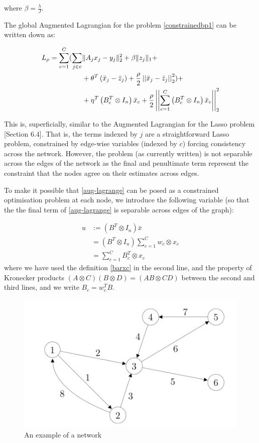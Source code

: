 \documentclass[conference]{IEEEtran}
\begin{document}
where \(\beta = \frac{\lambda}{J}\).

The global Augmented Lagrangian \cite{Boyd2010a}
 for the problem \eqref{constrainedbp1} can be written down as:

\begin{align}
L_\rho = \sum_{c=1}^C  ( \sum_{j \in c} & \|A_jx_j - y_j\|_2^2 + \beta\|z_j\|_1  + \nonumber \\ & + \theta^T\left(\bar{x}_j - \bar{z}_j\right)  +  \frac{\rho}{2}\vectornorm{\bar{x}_j-\bar{z}_j}_2^2 ) + \nonumber \\  & + \eta^T\left(B_c^T \otimes I_n\right)\bar{x}_c + \frac{\rho}{2}\vectornorm{\sum_{c=1}^C\left(B_c^T \otimes I_n\right)\bar{x}_c}_2^2
\label{aug-lagrange}
\end{align}

This is, superficially, similar to the Augmented Lagrangian for the Lasso problem \cite{Boyd2010a}[Section 6.4]. That is, the terms indexed by \(j\) are a straightforward Lasso problem, constrained by edge-wise variables (indexed by \(c\)) forcing consistency across the network. However, the problem (as currently written) is not separable across the edges of the network as the final and penultimate term represent the constraint that the nodes agree on their estimates across edges. 

To make it possible that \ref{aug-lagrange} can be posed  as a constrained optimisation problem at each node, we introduce the following variable (so that the the final term of \ref{aug-lagrange} is separable across edges of the graph):

\begin{defn}
\begin{align*}
u &:= \left(B^T \otimes I_n\right)\bar{x} \\
& = \left(B^T \otimes I_n\right)\sum_{c=1}^C w_c \otimes x_c \\
& = \sum	_{c=1}^C B_c^T\otimes x_c
\end{align*}
where we have used the definition \eqref{barxc} in the second line, and the property of Kronecker products \((A\otimes C)(B \otimes D) = (AB \otimes CD)\) between the second and third lines, and we write \(B_c = w_c^TB\).
\end{defn}

\begin{figure}[h]
\centering
\includegraphics[height = 5 cm]{network-ex-incidence-mat.jpg}
\caption{An example of a network}
\label{efig:ex-network}
\end{figure}
\end{document}

